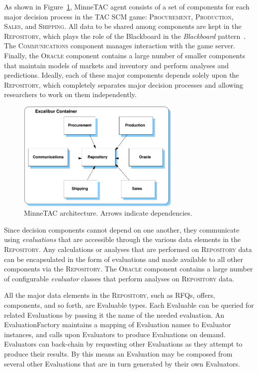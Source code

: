 \documentclass{article}
\begin{document}
As shown in Figure~\ref{fig:arch}, MinneTAC agent consists of a set of components for each major decision process in the TAC SCM game:  \textsc{Procurement}, \textsc{Production}, \textsc{Sales}, and \textsc{Shipping}.
All data to be shared among components are kept in the \textsc{Repository}, which plays the role of the Blackboard in the \emph{Blackboard} pattern~\cite{Busch96}.
The \textsc{Communications} component manages interaction with the game server.
Finally, the \textsc{Oracle} component contains a large number of smaller components that maintain models of markets and inventory and perform analyses and predictions.
Ideally, each of these major components depends solely upon the \textsc{Repository}, which completely separates major decision processes and allowing researchers to work on them independently.

\begin{figure}[ht]
\centering
\includegraphics[width=0.7\textwidth]{figures/arch}
\caption{\label{fig:arch}MinneTAC architecture.  Arrows indicate dependencies.}
\end{figure}

Since decision components cannot depend on one another, they communicate using \emph{evaluations} that are accessible through the various data elements in the \textsc{Repository}.
Any calculations or analyses that are performed on \textsc{Repository} data can be encapsulated in the form of evaluations and made available to all other components via the \textsc{Repository}.
The \textsc{Oracle} component contains a large number of configurable \emph{evaluator} classes that perform analyses on \textsc{Repository} data.

All the major data elements in the \textsc{Repository}, such as RFQs, offers, components, and so forth, are Evaluable types.
Each Evaluable can be queried for related Evaluations by passing it the name of the needed evaluation.
An EvaluationFactory maintains a mapping of Evaluation names to Evaluator instances, and calls upon Evaluators to produce Evaluations on demand.
Evaluators can back-chain by requesting other Evaluations as they attempt to produce their results.
By this means an Evaluation may be composed from several other Evaluations that are in turn generated by their own Evaluators.
\end{document}

